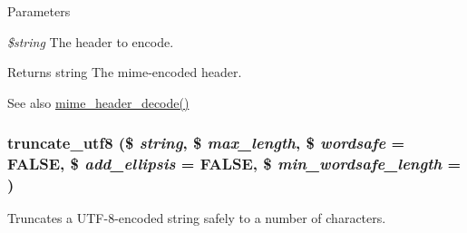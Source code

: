 \begin{DoxyParams}{Parameters}
\item[{\em \$string}]The header to encode.\end{DoxyParams}
\begin{DoxyReturn}{Returns}
string The mime-\/encoded header.
\end{DoxyReturn}
\begin{DoxySeeAlso}{See also}
\hyperlink{unicode_8inc_ab925f3117ef3c0d5736c4c38d0346aa3}{mime\_\-header\_\-decode()} 
\end{DoxySeeAlso}
\hypertarget{unicode_8inc_aadfc295e976cb61cb8e4f1f1cf0c781e}{
\subsubsection[{truncate\_\-utf8}]{\setlength{\rightskip}{0pt plus 5cm}truncate\_\-utf8 (\$ {\em string}, \/  \$ {\em max\_\-length}, \/  \$ {\em wordsafe} = {\ttfamily FALSE}, \/  \$ {\em add\_\-ellipsis} = {\ttfamily FALSE}, \/  \$ {\em min\_\-wordsafe\_\-length} = {})}}
\label{unicode_8inc_aadfc295e976cb61cb8e4f1f1cf0c781e}
Truncates a UTF-\/8-\/encoded string safely to a number of characters.


